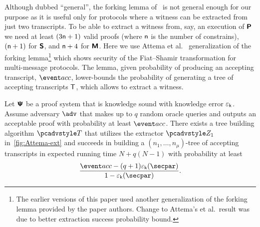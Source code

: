 Although dubbed ``general'', the forking lemma of~\cite{CCS:BelNev06} is not general
enough for our purpose as it is useful only for protocols where a witness can be
extracted from just two transcripts. To be able to extract a witness from, say, an
execution of $\bm{\mathsf{P}}$ we need at least $(3 \mathsf{n} + 1)$ valid proofs
(where $\mathsf{n}$ is the number of constrains),
$(\mathsf{n}+ 1)$ for $\bm{\mathsf{S}}$, and $\mathsf{n} + 4$ for $\bm{\mathsf{M}}$. Here we use Attema et
al.~\cite{EPRINT:AttFehKlo21} generalization of the forking lemma\footnote{The
	earlier versions of this paper used another generalization of the forking lemma
	provided by the paper authors. Change to Attema's et al.~result was due to better
	extraction success probability bound.}  which shows security of the Fiat--Shamir
transformation for multi-message protocols. The lemma, given probability of producing
an accepting transcript, $\accProb$, lower-bounds the probability of generating a
tree of accepting transcripts $\mathsf{T}$, which allows to extract a witness.

\begin{lemma}\label{lem:attema}
	 Let $\bm{\mathsf{\Psi}}$ be a proof system that is knowledge sound 
	with knowledge error $\varepsilon_{\mathsf{k}}$. Assume adversary $\adv$ that makes up to $q$ random
	oracle queries and outputs an acceptable proof with probability at least
	$\accProb$. There exists a tree building algorithm $\tdv$ that utilizes the extractor $\zdv_1$ in~\cref{fig:Attema-ext} and succeeds in building a
	$(n_1, \ldots, n_\mu)$-tree of accepting transcripts in expected
	running time $N + q (N - 1)$ with probability at least
	\[
	\frac{\accProb - (q + 1) \epsk (\secpar)}{1 - \epsk (\secpar)}.
	\]
	\end{lemma}

